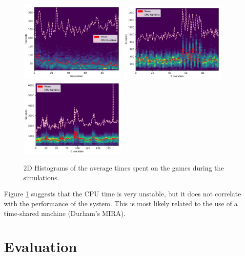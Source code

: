 \documentclass[12pt,a4paper]{article}
\begin{document}
            \begin{figure}[!ht]
                \centering
                \includegraphics[width=53mm]{images/results/1ply/simulation_timings.pdf}
                \includegraphics[width=53mm]{images/results/3ply/simulation_timings.pdf}
                \includegraphics[width=53mm]{images/results/6ply/simulation_timings.pdf}
                \caption{2D Histograms of the average times spent on the games during the simulations. \label{chart_cpu_times}}
            \end{figure}

            Figure \ref{chart_cpu_times} suggests that the CPU time is very unstable, but it does not correlate with the performance of the system. This is most likely related to the use of a  time-shared machine (Durham's MIRA). 

\section{Evaluation}
 
\end{document}
